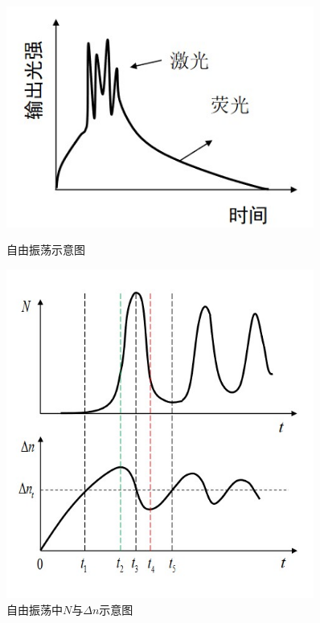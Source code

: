 \documentclass[a4paper,UTF8]{ctexart}
\begin{document}
\begin{figure}[H]
    \centering
    \begin{minipage}[b]{0.45\textwidth}
        \centering
        \includegraphics[width=0.9\textwidth]{./fig2.jpg}
        \caption{自由振荡示意图}
    \end{minipage}
    \begin{minipage}[b]{0.45\textwidth}
        \centering
        \includegraphics[width=0.9\textwidth]{./fig3.jpg}
        \caption{自由振荡中$N$与$\Delta n$示意图}
    \end{minipage}
\end{figure}
\end{document}
